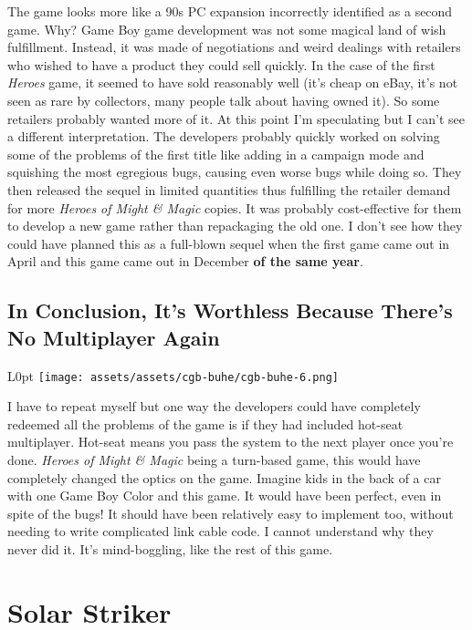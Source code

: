 \documentclass{book}
\begin{document}
The game looks more like a 90s PC expansion incorrectly identified as a second game. Why? Game Boy game development was not some magical land of wish fulfillment. Instead, it was made of negotiations and weird dealings with retailers who wished to have a product they could sell quickly. In the case of the first \emph{Heroes} game, it seemed to have sold reasonably well (it’s cheap on eBay, it’s not seen as rare by collectors, many people talk about having owned it). So some retailers probably wanted more of it. At this point I’m speculating but I can’t see a different interpretation. The developers probably quickly worked on solving some of the problems of the first title like adding in a campaign mode and squishing the most egregious bugs, causing even worse bugs while doing so. They then released the sequel in limited quantities thus fulfilling the retailer demand for more \emph{Heroes of Might \& Magic} copies. It was probably cost-effective for them to develop a new game rather than repackaging the old one. I don’t see how they could have planned this as a full-blown sequel when the first game came out in April and this game came out in December \textbf{of the same year}.

\FloatBarrier\needspace{5pt}\section*{In Conclusion, It’s Worthless Because There’s No Multiplayer Again}\nopagebreak[4]

\begin{wrapfigure}{L}{0pt} \texttt{[image: assets/assets/cgb-buhe/cgb-buhe-6.png]}\end{wrapfigure}
I have to repeat myself but one way the developers could have completely redeemed all the problems of the game is if they had included hot-seat multiplayer. Hot-seat means you pass the system to the next player once you’re done. \emph{Heroes of Might \& Magic} being a turn-based game, this would have completely changed the optics on the game. Imagine kids in the back of a car with one Game Boy Color and this game. It would have been perfect, even in spite of the bugs! It should have been relatively easy to implement too, without needing to write complicated link cable code. I cannot understand why they never did it. It’s mind-boggling, like the rest of this game.


\begingroup \chapter*{Solar Striker} \endgroup
\end{document}
